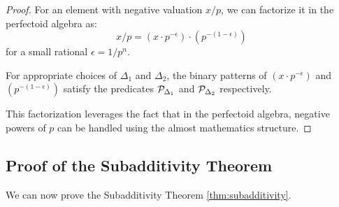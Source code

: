 \begin{proof}
For an element with negative valuation $x/p$, we can factorize it in the perfectoid algebra as:
$$x/p = (x \cdot p^{-\epsilon}) \cdot (p^{-(1-\epsilon)})$$
for a small rational $\epsilon = 1/p^n$.

For appropriate choices of $\Delta_1$ and $\Delta_2$, the binary patterns of $(x \cdot p^{-\epsilon})$ and $(p^{-(1-\epsilon)})$ satisfy the predicates $\mathcal{P}_{\Delta_1}$ and $\mathcal{P}_{\Delta_2}$ respectively.

This factorization leverages the fact that in the perfectoid algebra, negative powers of $p$ can be handled using the almost mathematics structure.
\end{proof}

\subsection{Proof of the Subadditivity Theorem}

We can now prove the Subadditivity Theorem \ref{thm:subadditivity}.

